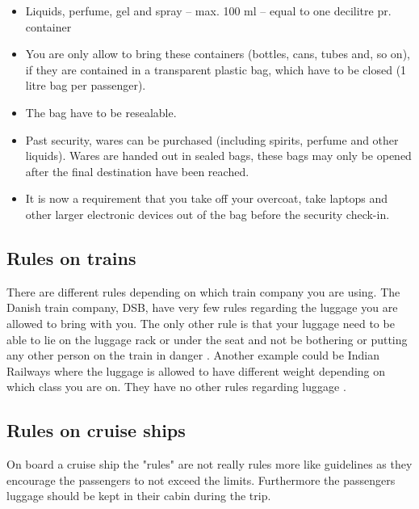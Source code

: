 \begin{itemize}
\item Liquids, perfume, gel and spray – max. 100 ml – equal to one decilitre pr. container
\item You are only allow to bring these containers (bottles, cans, tubes and, so on), if they are contained in a transparent plastic bag, which have to be closed (1 litre bag per passenger).
\item The bag have to be resealable.
\item Past security, wares can be purchased (including spirits, perfume and other liquids). Wares are handed out in sealed bags, these bags may only be opened after the final destination have been reached.
\item It is now a requirement that you take off your overcoat, take laptops and other larger electronic devices out of the bag before the security check-in.\\
\citep{Prohibited_luggage}
\end{itemize}

\subsection{Rules on trains}

There are different rules depending on which train company you are using. 
\newline
The Danish train company, DSB, have very few rules regarding the luggage you are allowed to bring with you. 
\newline\newline
The only other rule is that your luggage need to be able to lie on the luggage rack or under the seat and not be bothering or putting any other person on the train in danger \citep{rulestrain}.
\newline\newline
Another example could be Indian Railways where the luggage is allowed to have different weight depending on which class you are on. They have no other rules regarding luggage \citep{idianrules}.

\subsection{Rules on cruise ships}
On board a cruise ship the "rules" are not really rules more like guidelines as they encourage the passengers to not exceed the limits. Furthermore the passengers luggage should be kept in their cabin during the trip\citep{Cruise}.

